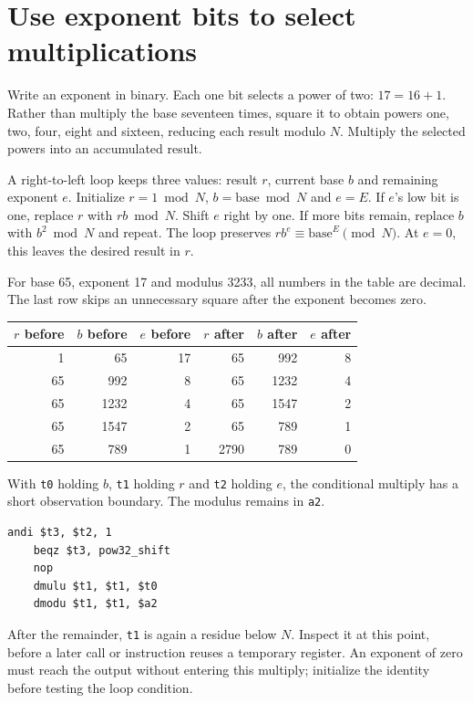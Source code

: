 \section{Use exponent bits to select multiplications}
Write an exponent in binary. Each one bit selects a power of two: \(17=16+1\).
Rather than multiply the base seventeen times, square it to obtain powers one, two,
four, eight and sixteen, reducing each result modulo \(N\). Multiply the selected
powers into an accumulated result.

A right-to-left loop keeps three values: result \(r\), current base \(b\) and remaining
exponent \(e\). Initialize \(r=1\bmod N\), \(b=\text{base}\bmod N\) and \(e=E\).
If \(e\)'s low bit is one, replace \(r\) with \(rb\bmod N\). Shift \(e\) right by one.
If more bits remain, replace \(b\) with \(b^2\bmod N\) and repeat. The loop preserves
\(r b^e\equiv\text{base}^{E}\pmod N\). At \(e=0\), this leaves the desired result in
\(r\).

For base 65, exponent 17 and modulus 3233, all numbers in the table are decimal.
The last row skips an unnecessary square after the exponent becomes zero.
\begin{center}
  \begin{tabular}{rrrrrr}
    \(r\) before & \(b\) before & \(e\) before & \(r\) after & \(b\) after & \(e\) after \\
    \hline
    1            & 65           & 17           & 65          & 992         & 8           \\
    65           & 992          & 8            & 65          & 1232        & 4           \\
    65           & 1232         & 4            & 65          & 1547        & 2           \\
    65           & 1547         & 2            & 65          & 789         & 1           \\
    65           & 789          & 1            & 2790        & 789         & 0           \\
  \end{tabular}
\end{center}

With \texttt{t0} holding \(b\), \texttt{t1} holding \(r\) and \texttt{t2} holding \(e\),
the conditional multiply has a short observation boundary. The modulus remains in
\texttt{a2}.

\begin{verbatim}
andi $t3, $t2, 1
    beqz $t3, pow32_shift
    nop
    dmulu $t1, $t1, $t0
    dmodu $t1, $t1, $a2
\end{verbatim}

After the remainder, \texttt{t1} is again a residue below \(N\). Inspect it at this
point, before a later call or instruction reuses a temporary register. An exponent
of zero must reach the output without entering this multiply; initialize the identity
before testing the loop condition.
